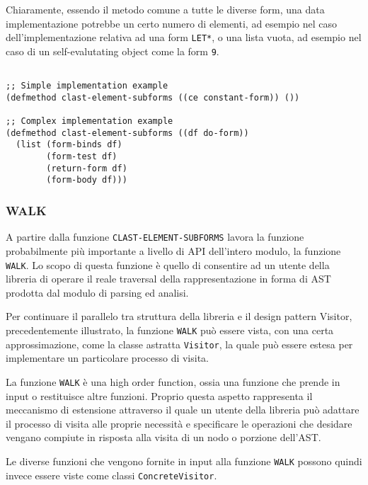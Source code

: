 Chiaramente, essendo il metodo comune a tutte le diverse form, una data
implementazione potrebbe un certo numero di elementi, ad esempio nel caso
dell'implementazione relativa ad una form \texttt{LET*}, o una lista vuota, ad
esempio nel caso di un self-evalutating object come la form \texttt{9}.

\begin{lstlisting}

;; Simple implementation example
(defmethod clast-element-subforms ((ce constant-form)) ())

;; Complex implementation example
(defmethod clast-element-subforms ((df do-form))
  (list (form-binds df)
        (form-test df)
        (return-form df)
        (form-body df)))

\end{lstlisting}

\subsubsection{WALK}

A partire dalla funzione \texttt{CLAST-ELEMENT-SUBFORMS} lavora la funzione
probabilmente più importante a livello di API dell'intero modulo, la funzione
\texttt{WALK}. Lo scopo di questa funzione è quello di consentire ad un utente
della libreria di operare il reale traversal della rappresentazione in forma
di AST prodotta dal modulo di parsing ed analisi.

Per continuare il parallelo tra struttura della libreria e il design pattern
Visitor, precedentemente illustrato, la funzione \texttt{WALK} può essere
vista, con una certa approssimazione, come la classe astratta
\texttt{Visitor}, la quale può essere estesa per implementare un particolare
processo di visita.


La funzione \texttt{WALK} è una high order function, ossia una funzione che
prende in input o restituisce altre funzioni. Proprio questa aspetto
rappresenta il meccanismo di estensione attraverso il quale un utente della
libreria può adattare il processo di visita alle proprie necessità e
specificare le operazioni che desidare vengano compiute in risposta alla
visita di un nodo o porzione dell'AST.

Le diverse funzioni che vengono fornite in input alla funzione \texttt{WALK}
possono quindi invece essere viste come classi \texttt{ConcreteVisitor}.

